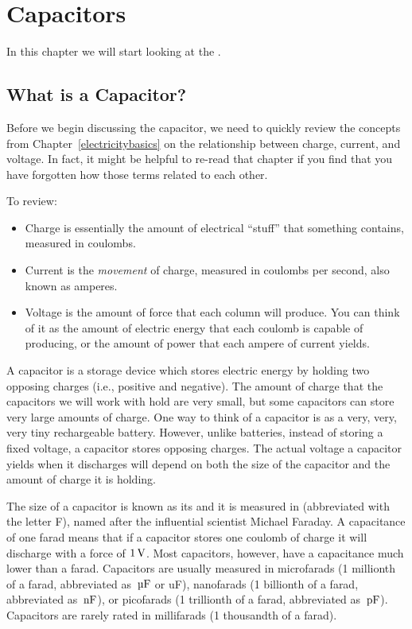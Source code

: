 \chapter{Capacitors}
\label{chapCapacitors}


In this chapter we will start looking at the . 

\section{What is a Capacitor?}

Before we begin discussing the capacitor, we need to quickly review the concepts from Chapter~\ref{electricitybasics} on the relationship between charge, current, and voltage.
In fact, it might be helpful to re-read that chapter if you find that you have forgotten how those terms related to each other.

To review:

\begin{itemize}
\item Charge is essentially the amount of electrical ``stuff'' that something contains, measured in coulombs.
\item Current is the \emph{movement} of charge, measured in coulombs per second, also known as amperes.
\item Voltage is the amount of force that each column will produce.  You can think of it as the amount of electric energy that each coulomb is capable of producing, or the amount of power that each ampere of current yields.  
\end{itemize}

A capacitor is a storage device which stores electric energy by holding two opposing charges (i.e., positive and negative).  
The amount of charge that the capacitors we will work with hold are very small, but some capacitors can store very large amounts of charge.
One way to think of a capacitor is as a very, very, very tiny rechargeable battery.
However, unlike batteries, instead of storing a fixed voltage, a capacitor stores opposing charges.
The actual voltage a capacitor yields when it discharges will depend on both the size of the capacitor and the amount of charge it is holding.

The size of a capacitor is known as its  and it is measured in  (abbreviated with the letter F), named after the influential scientist Michael Faraday.
A capacitance of one farad means that if a capacitor stores one coulomb of charge it will discharge with a force of $1\,\si{\volt}$.
Most capacitors, however, have a capacitance much lower than a farad.
Capacitors are usually measured in microfarads (1 millionth of a farad, abbreviated as $\,\si{\micro\farad}$ or uF), nanofarads (1 billionth of a farad, abbreviated as $\,\si{\nano\farad}$), or picofarads (1 trillionth of a farad, abbreviated as $\mypf$).  
Capacitors are rarely rated in millifarads (1 thousandth of a farad).

